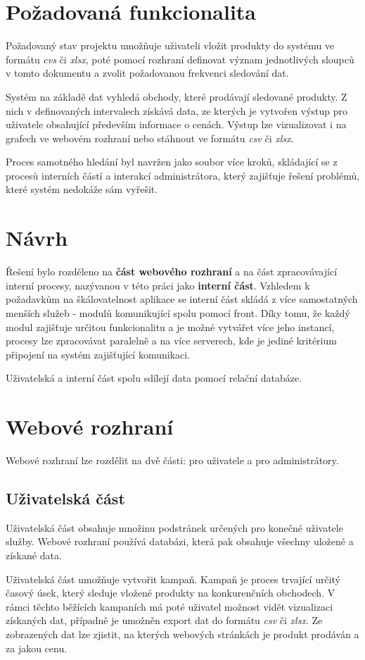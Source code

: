 \documentclass[thesis=B,czech]{FITthesis}[2012/06/26]
\begin{document}
\section{Požadovaná funkcionalita}
Požadovaný stav projektu umožňuje uživateli vložit produkty do systému ve formátu \textit{cvs} či \textit{xlsx}, poté pomocí
rozhraní definovat význam jednotlivých sloupců v tomto dokumentu a zvolit požadovanou frekvenci sledování dat.
\par
Systém na základě dat vyhledá obchody, které prodávají sledované produkty. Z nich v definovaných intervalech získává data, ze kterých je vytvořen výstup pro uživatele obsahující především informace o cenách. Výstup lze vizualizovat i na grafech ve webovém rozhraní nebo stáhnout ve formátu
\textit{csv} či \textit{xlsx}.
\par
Proces samotného hledání byl navržen jako soubor více kroků, skládající se z procesů interních částí a interakcí administrátora, který zajišťuje
řešení problémů, které systém nedokáže sám vyřešit.

\section{Návrh}
Řešení bylo rozděleno na \textbf{část webového rozhraní} a na část zpracovávající interní procesy, nazývanou v této práci 
jako \textbf{interní část}.
Vzhledem k požadavkům na škálovatelnost aplikace se interní část skládá z více samostatných menších služeb - modulů komunikující
spolu pomocí front. Díky tomu, že každý modul zajišťuje určitou funkcionalitu a je možné vytvářet více jeho instancí, procesy lze 
zpracovávat paralelně a na více serverech, kde je jediné kritérium připojení na systém zajišťující komunikaci.
\par
Uživatelská a interní část spolu sdílejí data pomocí relační databáze\cite{DB}.

\section{Webové rozhraní}
Webové rozhraní lze rozdělit na dvě části: pro uživatele a pro administrátory. 

\subsection{Uživatelská část}\label{ch:analysis-front-end}
Uživatelská část obsahuje množinu podstránek určených pro konečné uživatele
služby. Webové rozhraní používá databázi, která pak 
obsahuje všechny uložené a získané data.
\par
Uživatelská část umožňuje vytvořit kampaň. Kampaň je proces trvající určitý časový úsek, který sleduje vložené produkty na konkurenčních
obchodech.
V rámci těchto běžících kampaních má poté uživatel možnost vidět vizualizaci získaných dat, případně je umožněn export dat do formátu
\textit{csv} či \textit{xlsx}. Ze zobrazených dat lze zjistit, na kterých webových stránkách je produkt prodáván a za jakou cenu.
\end{document}
